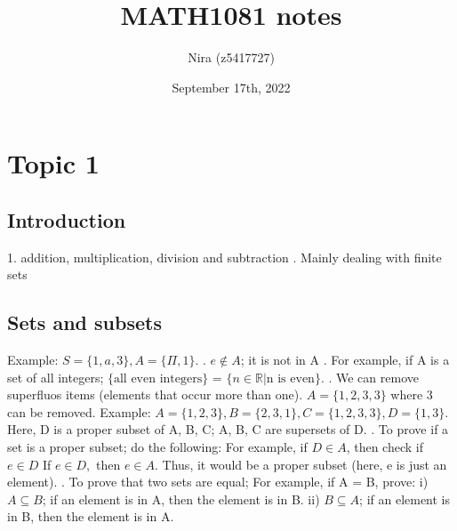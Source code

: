 \documentclass{article}
\title{MATH1081 notes}
\author{Nira (z5417727)}
\date{September 17th, 2022}
\begin{document}
\maketitle 
\tableofcontents
\newpage
\section{Topic 1}
\subsection{Introduction}
1. addition, multiplication, division and subtraction
. Mainly dealing with finite sets

\newpage
\subsection{Sets and subsets}
\newline
\newline
Example: $S = \{1, a, 3\}, A =\{\Pi, 1\}.$
. $e \notin A$; it is not in A
. For example, if A is a set of all integers; $\{ \text{all even integers} \}$
    = $\{n \in \mathbb{R} | \text{n is even}\}$.
. We can remove superfluos items (elements that occur more than one).
$A = \{ 1, 2, 3, 3 \}$ where $3$ can be removed.
\newline
\newline
\newline
Example:
\newline
$A = \{ 1, 2, 3 \},
B = \{2, 3, 1 \}, 
C = \{1, 2, 3, 3 \},
D = \{ 1 , 3 \}.$
\newline
Here, D is a proper subset of A, B, C; A, B, C are supersets of D.
\newline
{}
\newline
{}. To prove if a set is a proper subset; do the following:
\newline
For example, if $D \in A$, then check if $e \in D$
\newline
If $e \in D,$ then $e \in A$.
Thus, it would be a proper subset (here, e is just an element).
\newline
{}. To prove that two sets are equal;
\newline
For example, if A = B, prove:
\newline
i) $A \subseteq B$; if an element is in A, then the element is in B.
\newline
ii) $B \subseteq A$; if an element is in B, then the element is in A.
\newpage
\end{document}
